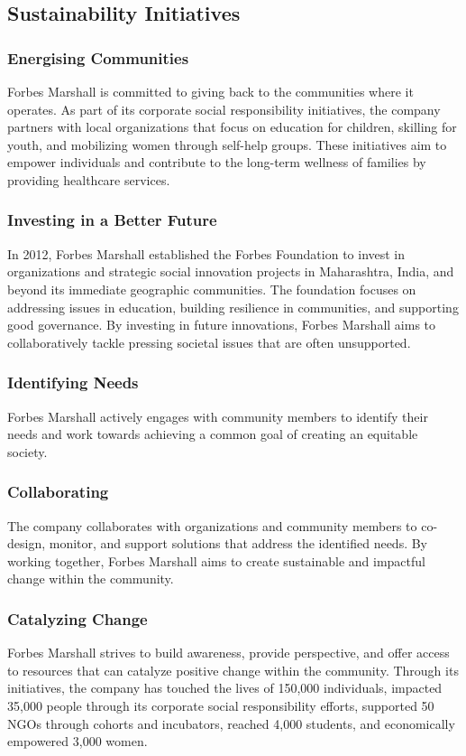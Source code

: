 \subsection{Sustainability Initiatives}
\subsubsection{Energising Communities}
Forbes Marshall is committed to giving back to the communities where it operates. As part of its corporate social responsibility initiatives, the company partners with local organizations that focus on education for children, skilling for youth, and mobilizing women through self-help groups. These initiatives aim to empower individuals and contribute to the long-term wellness of families by providing healthcare services.

\subsubsection{Investing in a Better Future}
In 2012, Forbes Marshall established the Forbes Foundation to invest in organizations and strategic social innovation projects in Maharashtra, India, and beyond its immediate geographic communities. The foundation focuses on addressing issues in education, building resilience in communities, and supporting good governance. By investing in future innovations, Forbes Marshall aims to collaboratively tackle pressing societal issues that are often unsupported.

\subsubsection{Identifying Needs}
Forbes Marshall actively engages with community members to identify their needs and work towards achieving a common goal of creating an equitable society.

\subsubsection{Collaborating}
The company collaborates with organizations and community members to co-design, monitor, and support solutions that address the identified needs. By working together, Forbes Marshall aims to create sustainable and impactful change within the community.

\subsubsection{Catalyzing Change}
Forbes Marshall strives to build awareness, provide perspective, and offer access to resources that can catalyze positive change within the community. Through its initiatives, the company has touched the lives of 150,000 individuals, impacted 35,000 people through its corporate social responsibility efforts, supported 50 NGOs through cohorts and incubators, reached 4,000 students, and economically empowered 3,000 women.
